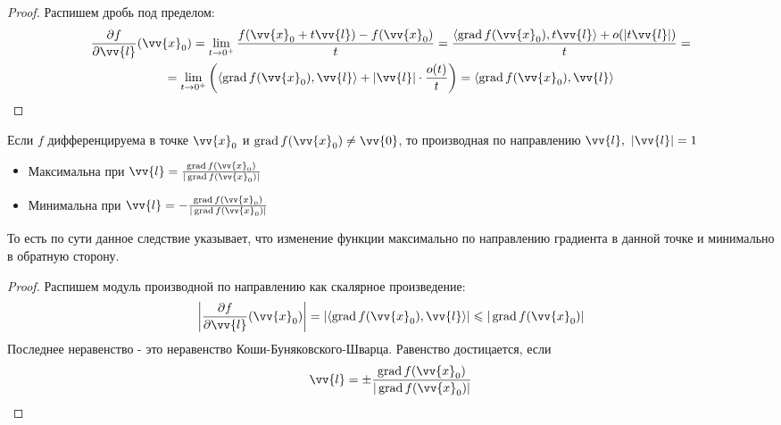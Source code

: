 \begin{proof}
	Распишем дробь под пределом:
	\begin{multline*}
		\pd{f}{\vv{l}}(\vv{x}_0) = \liml_{t \to 0^+}\frac{f(\vv{x}_0 + t\vv{l}) - f(\vv{x}_0)}{t} = \frac{\trbr{\grad f(\vv{x}_0), t\vv{l}} + o(|t\vv{l}|)}{t} = \\
		= \liml_{t \to 0^+} \left(\trbr{\grad f(\vv{x}_0), \vv{l}} + |\vv{l}| \cdot \frac{o(t)}{t}\right) = \trbr{\grad f(\vv{x}_0), \vv{l}}
	\end{multline*}
\end{proof}

\begin{corollary}
	Если $f$ дифференцируема в точке $\vv{x}_0$ и $\grad f(\vv{x}_0) \neq \vv{0}$, то производная по направлению $\vv{l},\ |\vv{l}| = 1$
	\begin{itemize}
		\item Максимальна при $\vv{l} = \frac{\grad f(\vv{x}_0)}{|\grad f(\vv{x}_0)|}$
		
		\item Минимальна при $\vv{l} = -\frac{\grad f(\vv{x}_0)}{|\grad f(\vv{x}_0)|}$
	\end{itemize}
\end{corollary}

\begin{note}
	То есть по сути данное следствие указывает, что изменение функции максимально по направлению градиента в данной точке и минимально в обратную сторону.
\end{note}

\begin{proof}
	Распишем модуль производной по направлению как скалярное произведение:
	\[
		\left|\pd{f}{\vv{l}} (\vv{x}_0)\right| = \left|\trbr{\grad f(\vv{x}_0), \vv{l}}\right| \le |\grad f(\vv{x}_0)|
	\]
	Последнее неравенство - это неравенство Коши-Буняковского-Шварца. Равенство достицается, если
	\[
		\vv{l} = \pm \frac{\grad f(\vv{x}_0)}{|\grad f(\vv{x}_0)|}
	\]
\end{proof}